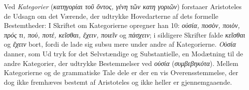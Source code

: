 \documentclass[12pt,a4paper]{book}
\newcommand{\gk}[1]{\textit{#1}}
\begin{document}
Ved \emph{Kategorier} (\gk{κατηγορίαι τοῦ ὄντος, γένη τῶν κατη\-%
γοριῶν}) forstaaer Aristoteles de Udsagn om det Værende, der
udtrykke Hovedarterne af dets formelle Bestemtheder: I Skriftet
om Kategorierne opregner han 10: \gk{οὐσία, ποσὸν, ποιὸν, πρός}
\gk{τι, πού, ποτέ, κεῖσθαι, ἔχειν, ποιεῖν} og \gk{πάσχειν}; i sildigere
Skrifter falde \gk{κεῖσθαι} og \gk{ἔχειν} bort, fordi de lade sig subsu\-%
mere under andre af Kategorierne. \gk{Οὐσία} danner, som Ud\-%
tryk for det Selvstændige og Substantielle, en Modætning til
de andre Kategorier, der udtrykke Bestemmelser ved \gk{οὐσία}
(\gk{συμβεβηκότα}). Mellem Kategorierne og de grammatiske Tale\-%
dele er der en vis Overensstemmelse, der dog ikke fremhæves
bestemt af Aristoteles og ikke heller er gjennemgaaende.
\end{document}
